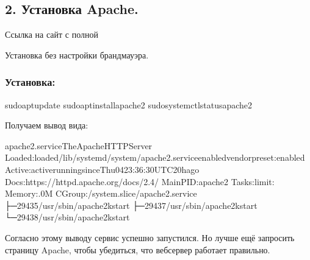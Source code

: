 \documentclass[a4paper,10pt,russian]{report}
\begin{document}
\subsection{2. Установка Apache.}
\label{\detokenize{docs:apache}}
\sphinxAtStartPar
Ссылка на сайт с полной 

\sphinxAtStartPar
Установка без настройки брандмауэра.


\subsubsection{Установка:}
\label{\detokenize{docs:id4}}
\begin{sphinxVerbatim}[commandchars=\\\{\}]
\PYGZdl{}sudoaptupdate
\PYGZdl{}sudoaptinstallapache2
\PYGZdl{}sudosystemctlstatusapache2
\end{sphinxVerbatim}

\sphinxAtStartPar
Получаем вывод вида:

\begin{sphinxVerbatim}[commandchars=\\\{\}]
apache2.service\PYGZhy{}TheApacheHTTPServer
Loaded:loaded/lib/systemd/system/apache2.serviceenabledvendorpreset:enabled
Active:activerunningsinceThu\PYGZhy{}04\PYGZhy{}23:36:30UTC20hago
Docs:https://httpd.apache.org/docs/2.4/
MainPID:apache2
Tasks:limit:
Memory:.0M
CGroup:/system.slice/apache2.service
├─29435/usr/sbin/apache2\PYGZhy{}kstart
├─29437/usr/sbin/apache2\PYGZhy{}kstart
└─29438/usr/sbin/apache2\PYGZhy{}kstart
\end{sphinxVerbatim}

\sphinxAtStartPar
Согласно этому выводу сервис успешно запустился. Но лучше ещё запросить страницу Apache, чтобы убедиться, что веб\sphinxhyphen{}сервер работает правильно.
\end{document}
